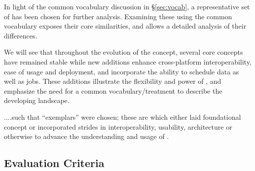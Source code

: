 \documentclass{sig-alternate}
\begin{document}

In light of the common vocabulary discussion in \S\ref{sec:vocab}, a
representative set of \pilotjobs has been chosen for further analysis.
Examining these \pilotjobs using the common vocabulary exposes their
core similarities, and allows a detailed analysis of their
differences.

We will see that throughout the evolution of the \pilotjob concept,
several core concepts have remained stable while new additions enhance
cross-platform interoperability, ease of usage and deployment, and
incorporate the ability to schedule data as well as jobs.  These
additions illustrate the flexibility and power of \pilotjobs, and
emphasize the need for a common vocabulary/treatment to describe the
developing landscape.



 ....such that ``exemplars'' were chosen; these
are \pilotjobs which either laid foundational \pilotjob concept or
incorporated strides in interoperability, usability, architecture or
otherwise to advance the understanding and usage of \pilotjobs.




\subsection{Evaluation Criteria}\label{ssec:evaluation}
\end{document}
